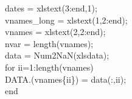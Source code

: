 \hspace{1mm}\hspace{5mm} \hspace{5mm} \hspace{5mm} \hspace{5mm} dates = xlstext(3:end,1); \\ 
\hspace{1mm}\hspace{5mm} \hspace{5mm} \hspace{5mm} \hspace{5mm} vnames\_long = xlstext(1,2:end); \\ 
\hspace{1mm}\hspace{5mm} \hspace{5mm} \hspace{5mm} \hspace{5mm} vnames = xlstext(2,2:end); \\ 
\hspace{1mm}\hspace{5mm} \hspace{5mm} \hspace{5mm} \hspace{5mm} nvar = length(vnames); \\ 
\hspace{1mm}\hspace{5mm} \hspace{5mm} \hspace{5mm} \hspace{5mm} data   = Num2NaN(xlsdata); \\ 
\hspace{1mm}\hspace{5mm} \hspace{5mm} \hspace{5mm} \hspace{5mm} \textcolor{matlabblue}{for} ii=1:length(vnames) \\ 
\hspace{1mm}\hspace{5mm} \hspace{5mm} \hspace{5mm} \hspace{5mm} \hspace{5mm} DATA.(vnames\{ii\}) = data(:,ii); \\ 
\hspace{1mm}\hspace{5mm} \hspace{5mm} \hspace{5mm} \hspace{5mm} \textcolor{matlabblue}{end} \\ 
